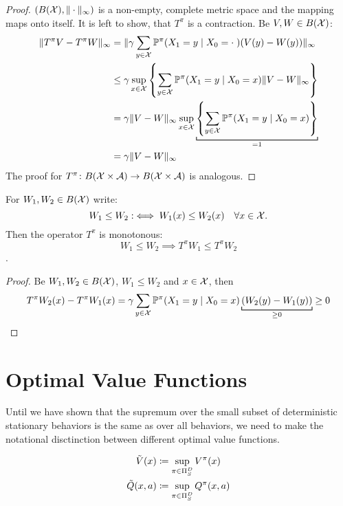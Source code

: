 \begin{proof}
\((B(\mathcal{X}), \|\cdot\|_\infty)\) is a non-empty, complete metric space and the mapping maps onto itself. It is left to show, that \(T^\pi\) is a contraction. Be \(V,W\in B(\mathcal{X})\):
\begin{align*}
	\|T^\pi V -T^\pi W\|_\infty 
	&=\|\gamma\sum_{y\in\cX} \Pr^\pi(X_1=y\mid X_0=\cdot\;) (V(y)-W(y))\|_\infty\\
	&\le\gamma \sup_{x\in\cX}\left\{ \sum_{y\in\cX} 
	\Pr^\pi(X_1=y\mid X_0=x) \|V-W\|_\infty \right\}\\
	&=\gamma \|V-W\|_\infty  \sup_{x\in\cX}\underbracket[0.7pt]{
		\left\{ \sum_{y\in\cX} \Pr^\pi(X_1=y\mid X_0=x) \right\}
	}_{=1}\\
	&=\gamma \|V-W\|_\infty
\end{align*}
The proof for \(T^\pi\colon B(\mathcal{X}\times\mathcal{A})\to B(\mathcal{X}\times\mathcal{A})\) is analogous.
\end{proof}

\begin{lemma}\label{properties T^pi} For \(W_1,W_2\in B(\mathcal{X})\) write:
	\[
		W_1 \le W_2 :\iff  W_1(x)\le W_2(x) \quad \forall x\in\mathcal{X}.
	\]
	Then the operator \(T^\pi\) is monotonous: 
		\[W_1\le W_2 \implies T^\pi W_1\le T^\pi W_2\].
\end{lemma}

\begin{proof}
 Be \(W_1,W_2\in B(\mathcal{X})\), \(W_1\le W_2\) and \(x\in\mathcal{X}\), then
\[
	T^\pi W_2 (x) - T^\pi W_1(x) 
	= \gamma \sum_{y\in\cX} \Pr^\pi(X_1=y\mid X_0=x) \underbracket[0.7pt]{
		(W_2(y)-W_1(y))
	}_{\ge 0} \ge 0 \qedhere
\]
\end{proof}

\section{Optimal Value Functions}
Until we have shown that the supremum over the small subset of deterministic stationary behaviors is the same as over all behaviors, we need to make the notational disctinction between different optimal value functions.

\begin{definition}
\begin{align*}
	\tilde{V}(x)&\coloneqq \sup_{\pi\in\Pi_S^D} V^\pi(x)\\
	\tilde{Q}(x,a)&\coloneqq \sup_{\pi\in\Pi_S^D} Q^\pi(x,a)
\end{align*}
\end{definition}

